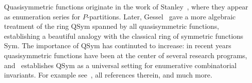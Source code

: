\documentclass[12pt]{amsart}
\theoremstyle{definition}
\theoremstyle{remark}
\numberwithin{equation}{section}
\newcommand{\QQ}{\mathbb{Q}}
\newcommand{\Sym}{\mathrm{Sym}}
\newcommand{\QSym}{\mathrm{QSym}}
\begin{document}
%
%

%
%
%

Quasisymmetric functions originate in the work of Stanley~\cite{StanleyQSym}, where they appear as enumeration series for $P$-partitions.  
Later, Gessel~\cite{Gessel} gave a more algebraic treatment of the ring $\QSym$ spanned by all quasisymmetric functions, establishing a beautiful analogy with the classical ring of symmetric functions $\Sym$. 
The importance of $\QSym$ has continuted to increase: in recent years quasisymmetric functions have been at the center of several research programs, and~\cite{ABS} establishes $\QSym$ as a universal setting for enumerative combinatorial invariants.  For example see~\cite{Grinberg,LMvW, Mason}, all references therein, and much more.
\end{document}
